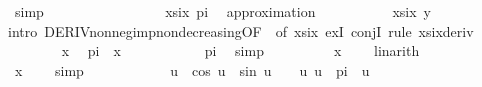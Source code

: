 \begin{isabellebody}
\ simp\isanewline
\ \ \isamarkupfalse%
\isanewline
\ \ \ \ \isamarkupfalse%
\ {}\isanewline
\ \ \ \ \isamarkupfalse%
\ {\isachardoublequoteopen}{\isacharminus}{\kern0pt}{}{\isachardot}{\kern0pt}{}{}{}\ {\isasymle}\ xsix\ {\isacharparenleft}{\kern0pt}{}{\isacharslash}{\kern0pt}pi{\isacharparenright}{\kern0pt}{\isachardoublequoteclose}\ \isamarkupfalse%
\ {\isacharparenleft}{\kern0pt}approximation\ {}{\isacharparenright}{\kern0pt}\isanewline
\ \ \ \ \isamarkupfalse%
\ \isamarkupfalse%
\ {\isachardoublequoteopen}{\isasymdots}\ {\isasymle}\ xsix\ y{\isachardoublequoteclose}\isanewline
\ \ \ \ \isamarkupfalse%
{\isacharparenleft}{\kern0pt}intro\ DERIV{\isacharunderscore}{\kern0pt}nonneg{\isacharunderscore}{\kern0pt}imp{\isacharunderscore}{\kern0pt}nondecreasing{\isacharbrackleft}{\kern0pt}OF\ {}{\isacharcomma}{\kern0pt}\ of\ xsix{\isacharbrackright}{\kern0pt}\ exI\ conjI{\isacharcomma}{\kern0pt}\ rule\ xsix{\isacharunderscore}{\kern0pt}deriv{\isacharparenright}{\kern0pt}\isanewline
\ \ \ \ \ \ \isamarkupfalse%
\ x\ \isamarkupfalse%
\ {\isachardoublequoteopen}{}{\isacharslash}{\kern0pt}pi\ {\isasymle}\ x{\isachardoublequoteclose}\isanewline
\ \ \ \ \ \ \isamarkupfalse%
\ \isamarkupfalse%
\ {\isachardoublequoteopen}{}\ {\isacharless}{\kern0pt}\ {}{\isacharslash}{\kern0pt}pi{\isachardoublequoteclose}\ \isamarkupfalse%
\ simp\isanewline
\ \ \ \ \ \ \isamarkupfalse%
\ \isamarkupfalse%
\ {\isachardoublequoteopen}x\ {\isachargreater}{\kern0pt}\ {}{\isachardoublequoteclose}\ \isamarkupfalse%
\ linarith\isanewline
\ \ \ \ \ \ \isamarkupfalse%
\ \isamarkupfalse%
\ {\isachardoublequoteopen}x\ {\isasymnoteq}\ {}{\isachardoublequoteclose}\ \isamarkupfalse%
\ simp\isanewline
\ \ \ \ \ \ \isamarkupfalse%
\ {\isacharasterisk}{\kern0pt}{\isacharcolon}{\kern0pt}\ {\isachardoublequoteopen}{}\ {\isasymle}\ {\isacharminus}{\kern0pt}\ u\ {\isacharasterisk}{\kern0pt}\ cos\ u\ {\isacharplus}{\kern0pt}\ sin\ u{\isachardoublequoteclose}\ \ {\isachardoublequoteopen}{}\ {\isasymle}\ u{\isachardoublequoteclose}\ {\isachardoublequoteopen}u\ {\isasymle}\ pi{\isachardoublequoteclose}\ \ u\isanewline

\end{isabellebody}
